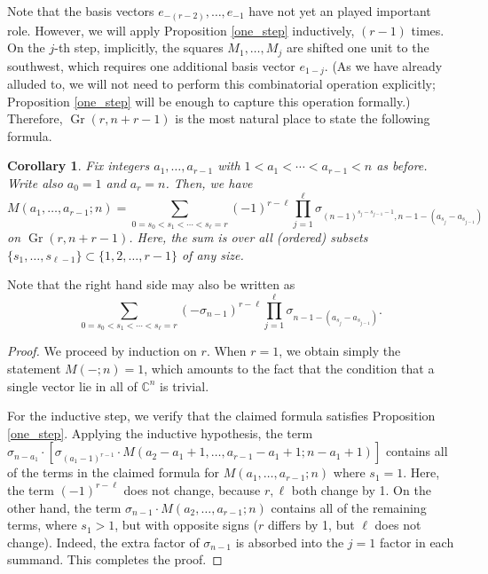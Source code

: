 \documentclass[11pt]{article}
\newtheorem{coro}[theo]{Corollary}
\theoremstyle{definition}
\numberwithin{equation}{section}
\newcommand{\bC}{\mathbb{C}}
\DeclareMathOperator{\Gr}{Gr}
\begin{document}
Note that the basis vectors $e_{-(r-2)},\ldots,e_{-1}$ have not yet an played important role. However, we will apply Proposition \ref{one_step} inductively, $(r-1)$ times. On the $j$-th step, implicitly, the squares $M_1,\ldots,M_j$ are shifted one unit to the southwest, which requires one additional basis vector $e_{1-j}$. (As we have already alluded to, we will not need to perform this combinatorial operation explicitly; Proposition \ref{one_step} will be enough to capture this operation formally.) Therefore, $\Gr(r,n+r-1)$ is the most natural place to state the following formula.

\begin{coro}\label{explicit_M}
Fix integers $a_1,\ldots,a_{r-1}$ with $1<a_1<\cdots<a_{r-1}<n$ as before. Write also $a_0=1$ and $a_r=n$. Then, we have
\begin{equation*}
M(a_1,\ldots,a_{r-1};n)=\sum_{0=s_0<s_1<\cdots< s_\ell =r}(-1)^{r-\ell}\prod_{j=1}^{\ell}\sigma_{(n-1)^{s_j-s_{j-1}-1},n-1-(a_{s_j}-a_{s_{j-1}})}
\end{equation*}
on $\Gr(r,n+r-1)$. Here, the sum is over all (ordered) subsets $\{s_1,\ldots,s_{\ell-1}\}\subset\{1,2,\ldots,r-1\}$ of any size.
\end{coro}
Note that the right hand side may also be written as
\begin{equation*}
\sum_{0=s_0<s_1<\cdots< s_\ell =r}(-\sigma_{n-1})^{r-\ell}\prod_{j=1}^{\ell}\sigma_{n-1-(a_{s_j}-a_{s_{j-1}})}.
\end{equation*}
\begin{proof}
We proceed by induction on $r$. When $r=1$, we obtain simply the statement $M(-;n)=1$, which amounts to the fact that the condition that a single vector lie in all of $\bC^n$ is trivial.

For the inductive step, we verify that the claimed formula satisfies Proposition \ref{one_step}. Applying the inductive hypothesis, the term $\sigma_{n-a_1}\cdot [\sigma_{(a_1-1)^{r-1}}\cdot M(a_2-a_1+1,\ldots,a_{r-1}-a_1+1;n-a_1+1)]$ contains all of the terms in the claimed formula for $M(a_1,\ldots,a_{r-1};n)$ where $s_1=1$. Here, the term $(-1)^{r-\ell}$ does not change, because $r,\ell$ both change by 1. On the other hand, the term $\sigma_{n-1}\cdot M(a_2,\ldots,a_{r-1};n)$ contains all of the remaining terms, where $s_1>1$, but with opposite signs ($r$ differs by 1, but $\ell$ does not change). Indeed, the extra factor of $\sigma_{n-1}$ is absorbed into the $j=1$ factor in each summand. This completes the proof.
\end{proof}
\end{document}
